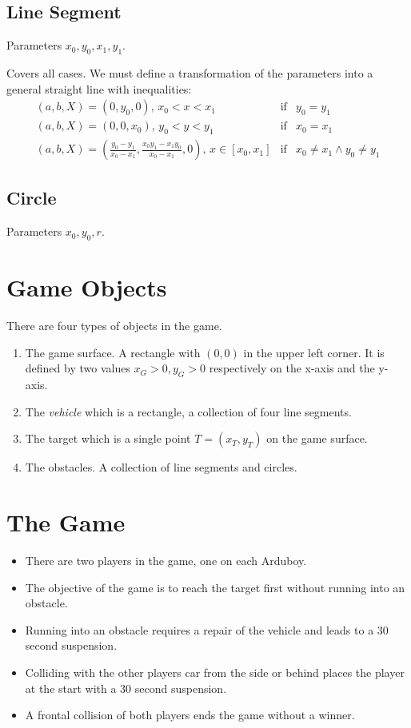 \documentclass[11pt]{article}
\begin{document}
\subsection*{Line Segment}

Parameters $x_0, y_0, x_1, y_1$. 

Covers all cases. We must define a transformation of the parameters into a
general straight line with inequalities:
\begin{eqnarray*}
    (a, b, X) = (0, y_0, 0) ,\, x_0 < x < x_1 &\text{if}& 
        y_0 = y_1\\
    (a, b, X) = (0, 0, x_0) ,\, y_0 < y < y_1 &\text{if}& 
        x_0 = x_1\\
    (a, b, X) = \left(\frac{y_0 - y_1}{x_0-x_1},
            \frac{x_0 y_1 - x_1 y_0}{x_0 - x_1}, 0\right),\,
    x\in[x_0, x_1] &\text{if}& x_0\neq x_1 \land y_0\neq y_1
\end{eqnarray*}

\subsection*{Circle}

Parameters $x_0, y_0, r$.

\section{Game Objects}
\label{sec:game:objects}
There are four types of objects in the game. 
\begin{enumerate}
    \item The game surface. A rectangle with $(0,0)$ in the upper left corner. 
        It is defined by two values $x_G > 0, y_G>0$ respectively on the x-axis
        and the y-axis.
    \item The {\sl vehicle} which is a rectangle, a collection of four line
        segments.
    \item The target which is a single point $T = (x_T, y_T)$ on the game
        surface.
    \item The obstacles. A collection of line segments and circles.
\end{enumerate}

\section{The Game}
\label{sec:the:game}
\begin{itemize}
    \item There are two players in the game, one on each Arduboy. 
    \item The objective of the game is to reach the target first without 
        running into an obstacle. 
    \item Running into an obstacle requires a repair of the vehicle and leads 
        to a 30 second suspension. 
    \item Colliding with the other players car from the side or behind places
        the player at the start with a 30 second suspension.
    \item A frontal collision of both players ends the game without a winner.
\end{itemize}
\end{document}
